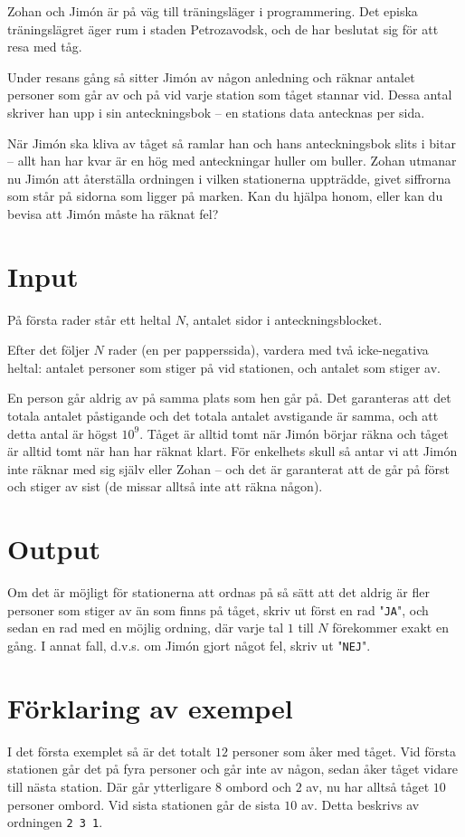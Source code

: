 
Zohan och Jimón är på väg till träningsläger i programmering. Det episka träningslägret äger rum i staden Petrozavodsk, och de har beslutat sig för att resa med tåg.

Under resans gång så sitter Jimón av någon anledning och räknar antalet personer som går av och på vid varje station som tåget stannar vid. Dessa antal skriver han
upp i sin anteckningsbok -- en stations data antecknas per sida.

När Jimón ska kliva av tåget så ramlar han och hans anteckningsbok slits i bitar -- allt han har kvar är en hög med anteckningar huller om buller. Zohan utmanar nu
Jimón att återställa ordningen i vilken stationerna uppträdde, givet siffrorna som står på sidorna som ligger på marken. Kan du hjälpa honom, eller kan du bevisa att
Jimón måste ha räknat fel?

\section*{Input}
På första rader står ett heltal $N$, antalet sidor i anteckningsblocket.

Efter det följer $N$ rader (en per papperssida), vardera med två icke-negativa
heltal: antalet personer som stiger på vid stationen, och antalet som stiger
av.

En person går aldrig av på samma plats som hen går på. Det garanteras att det
totala antalet påstigande och det totala antalet
avstigande är samma, och att detta antal är högst $10^9$. Tåget är alltid tomt
när Jimón börjar räkna och tåget är alltid tomt när han har räknat klart. För
enkelhets skull så antar vi att Jimón inte räknar med sig själv eller Zohan -- och
det är garanterat att de går på först och stiger av sist (de missar alltså inte att
räkna någon).

\section*{Output}
Om det är möjligt för stationerna att ordnas på så sätt att det aldrig är fler
personer som stiger av än som finns på tåget, skriv ut först en rad
"\texttt{JA}", och sedan en rad med en möjlig ordning, där varje tal $1$ till
$N$ förekommer exakt en gång.
I annat fall, d.v.s. om Jimón gjort något fel, skriv ut "\texttt{NEJ}".

\section*{Förklaring av exempel}
I det första exemplet så är det totalt $12$ personer som åker med tåget. Vid första stationen
går det på fyra personer och går inte av någon, sedan åker tåget vidare till
nästa station. Där går ytterligare $8$ ombord och $2$ av, nu har alltså tåget $10$
personer ombord. Vid sista stationen går de sista $10$ av. Detta beskrivs av ordningen
\texttt{2 3 1}.

